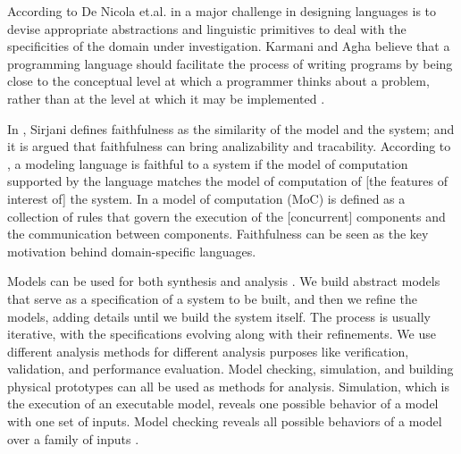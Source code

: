 According to De Nicola et.al. in \cite{DBLP:conf/coordination/NicolaFPT18} a major challenge in designing languages is to devise appropriate abstractions and linguistic primitives to deal with the specificities of the domain under investigation.
%
Karmani and Agha believe that a programming language should facilitate the process of writing programs by being close to the conceptual level at which a programmer thinks about a problem, rather than at the level at which it may be implemented \cite{DBLP:reference/parallel/KarmaniA11}. 

In \cite{DBLP:conf/birthday/FriendlinessSirjani18}, Sirjani defines faithfulness as the similarity of the
model and the system; and it is argued that faithfulness can bring  analizability and tracability. 
According to \cite{DBLP:conf/birthday/FriendlinessSirjani18}, a modeling
language is faithful to a system if the model of computation supported by the
language matches the model of computation of [the features of interest of] the
system. 
In \cite{Ptolemy:14:Book} a model of computation (MoC) is defined as a collection of rules that govern
the execution of the [concurrent] components and the communication between
components.
Faithfulness can be seen as the key motivation behind domain-specific
languages.

Models can be used for both synthesis and analysis \cite{DBLP:conf/facs2/LeeS18}. We build abstract models that serve as a specification of a system to be built, and then we refine the models, adding
details until we build the system itself. The process is usually iterative, with
the specifications evolving along with their refinements. We use different analysis methods for different analysis purposes like verification, validation, and performance evaluation. 
Model checking, simulation, and building physical prototypes can all be used as methods for analysis. Simulation, which is the execution of an executable
model, reveals one possible behavior of a model with one set of inputs. Model
checking reveals all possible behaviors of a model over a family of inputs \cite{DBLP:conf/facs2/LeeS18}.


